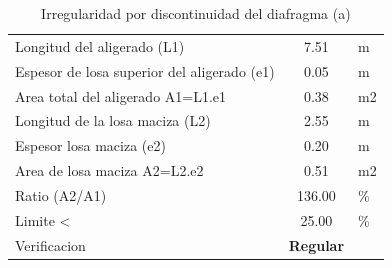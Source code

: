 \begin{table}[h!]
  \centering
  \caption{Irregularidad por discontinuidad del diafragma (a)}
    \begin{tabular}{|ll|c|r}
\cline{1-3}    \multicolumn{2}{|l|}{Longitud del aligerado (L1)} & 7.51 & \multicolumn{1}{l}{m} \\
\cline{1-3}    \multicolumn{2}{|l|}{Espesor de losa superior del aligerado (e1)} & 0.05  & \multicolumn{1}{l}{m} \\
\cline{1-3}    \multicolumn{2}{|l|}{Area total del aligerado A1=L1.e1} & 0.38 & \multicolumn{1}{l}{m2} \\
\cline{1-3}    \multicolumn{2}{|l|}{Longitud de la losa maciza (L2)} & 2.55 & \multicolumn{1}{l}{m} \\
\cline{1-3}    \multicolumn{2}{|l|}{Espesor losa maciza (e2)} & 0.20  & \multicolumn{1}{l}{m} \\
\cline{1-3}    \multicolumn{2}{|l|}{Area de losa maciza A2=L2.e2} & 0.51 & \multicolumn{1}{l}{m2} \\
\cline{1-3}    \multicolumn{2}{|l|}{Ratio (A2/A1)} & 136.00 & \multicolumn{1}{l}{\%} \\
\cline{1-3}    \multicolumn{2}{|l|}{Limite <} & 25.00 & \multicolumn{1}{l}{\%} \\
\cline{1-3}    \multicolumn{2}{|l|}{Verificacion} & \textcolor[rgb]{ .267,  .447,  .769}{\textbf{Regular}} &  \\
\cline{1-3}    \end{tabular}%
  \label{tab:addlabel}%
\end{table}%

